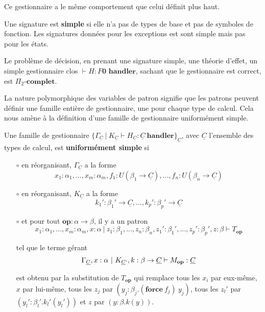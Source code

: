 	
Ce gestionnaire a le même comportement que celui définit plus haut.

\begin{remark}
	Une signature est \textbf{simple} si elle n'a pas de types de base et pas de symboles de fonction. Les signatures données pour les exceptions est sont simple mais pas pour les états.
\end{remark}

\begin{theorem}
	Le problème de décision, en prenant une signature simple, une théorie d'effet, un simple gestionnaire clos $\vdash H:F\textbf{0~handler}$, sachant que le gestionnaire est correct, est $\Pi_2$-$\textbf{complet}$.
\end{theorem}

La nature polymorphique des variables de patron signifie que les patrons peuvent définir une famille entière de gestionnaire, une pour chaque type de calcul. Cela nous amène à la définition d'une famille de gestionnaire uniformément simple.

\begin{definition}
	Une famille de gestionnaire $\{\Gamma_{\underline{C}}~|~K_{\underline{C}} \vdash H_{\underline{C}}:\underline{C}~\textbf{handler}\}_{\underline{C}}$, avec $\underline{C}$ l'ensemble des types de calcul, est \textbf{uniformément simple} si
	
	\begin{enumerate}
		\item[$\circ$] en réorganisant, $\Gamma_{\underline{C}}$ a la forme 
		\[x_1:\alpha_1,...,x_m:\alpha_m,f_1:U(\beta_1 \rightarrow \underline{C}),...,f_n:U(\beta_n \rightarrow \underline{C})\]
		
		\item[$\circ$] en réorganisant, $K_{\underline{C}}$ a la forme
		\[k_1':\beta_1' \rightarrow \underline{C},...,k_p':\beta_p' \rightarrow \underline{C}\]
		
		\item[$\circ$] et pour tout $\textbf{op}: \alpha \rightarrow \beta$, il y a un patron
		\[x_1:\alpha_1,...,x_m:\alpha_m,x:\alpha~|~z_1:\beta_1,...,z_n:\beta_n,z_1':\beta_1',...,z_p':\beta_p',z:\beta \vdash T_\textbf{op}\]
		
		tel que le terme gérant 
		\[\Gamma_{\underline{C}},x:\alpha~|~K_{\underline{C}`},k:\beta \rightarrow \underline{C} \vdash M_\textbf{op}:\underline{C}\]
		
		est obtenu par la substitution de $T_\textbf{op}$ qui remplace tous les $x_i$ par eux-même, $x$ par lui-même, tous les $z_j$ par $(y_j:\beta_j.(\textbf{force}~f_j)~y_j)$, tous les $z_l'$ par $(y_l':\beta_l'.k_l'(y_l'))$ et $z$ par $(y:\beta.k(y))$.
	\end{enumerate}
\end{definition}
\newpage


